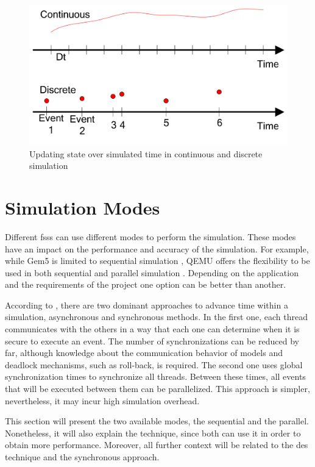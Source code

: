 \begin{figure}[H]
	\centering
 	\includegraphics[width=0.7\linewidth]{Images/DesVsCes.png}
 	\caption{Updating state over simulated time in continuous and discrete simulation \cite{helal2008hybrid}}
	 \label{fig_DesVsCes}
\end{figure}


\section{Simulation Modes}

Different \glspl{fss} can use different modes to perform the simulation. These modes have an impact on the performance and accuracy of the 
simulation. For example, while Gem5 is limited to sequential simulation \cite{TheGem5Simulator}, QEMU offers the flexibility to be used in both 
sequential and parallel simulation \cite{QEMUDoc}. Depending on the application and the requirements of the project one option can be better 
than another.

According to \cite{parallelTypes}, there are two dominant approaches to advance time within a simulation, asynchronous and synchronous methods. 
In the first one, each thread communicates with the others in a way that each one can determine when it is secure to execute an event. The number 
of synchronizations can be reduced by far, although knowledge about the communication behavior of models and deadlock mechanisms, such as 
roll-back, is required. The second one uses global synchronization times to synchronize all threads. Between these times, all events that will 
be executed between them can be parallelized. This approach is simpler, nevertheless, it may incur high simulation overhead.

This section will present the two available modes, the sequential and the parallel. Nonetheless, it will also explain 
the  technique, since both can use it in order to obtain more performance. Moreover, all further context will be related to 
the \gls{des} technique and the synchronous approach.

